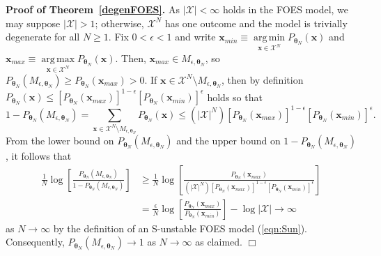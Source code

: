 \documentclass[12pt]{article}
\theoremstyle{definition}
\DeclareMathOperator*{\argmin}{arg\,min}
\DeclareMathOperator*{\argmax}{arg\,max}
\begin{document}
\noindent\textbf{Proof of Theorem~\ref{degenFOES}.} As
\(|\mathcal{X}|<\infty\) holds in the FOES model, we may suppose
\(|\mathcal{X}|>1\);
otherwise,   \(\mathcal{X}^N\) has  one outcome and the model is  trivially degenerate for all
\(N \geq 1\). Fix \(0 < \epsilon < 1\) and write
\(\boldsymbol x_{min} \equiv \argmin\limits_{\boldsymbol x \in \mathcal{X}^N}P_{\boldsymbol \theta_N}(\boldsymbol x)\)
and
\(\boldsymbol x_{max} \equiv \argmax\limits_{\boldsymbol x \in \mathcal{X}^N}P_{\boldsymbol \theta_N}(\boldsymbol x)\). Then,
\(\boldsymbol x_{max} \in M_{\epsilon, \boldsymbol \theta_N}\), so
\(P_{\boldsymbol \theta_N}(M_{\epsilon, \boldsymbol \theta_N}) \ge P_{\boldsymbol \theta_N}(\boldsymbol x_{max}) > 0\).
If
\(\boldsymbol x \in \mathcal{X}^N \setminus M_{\epsilon, \boldsymbol \theta_N}\),
then by definition
\(P_{\boldsymbol \theta_N}(\boldsymbol x) \le [P_{\boldsymbol \theta_N}(\boldsymbol x_{max})]^{1-\epsilon}[P_{\boldsymbol \theta_N}(\boldsymbol x_{min})]^{\epsilon}\)
holds so that
\[
1-P_{\boldsymbol \theta_N}(M_{\epsilon, \boldsymbol \theta_N})
 = \sum\limits_{\boldsymbol x \in \mathcal{X}^N \setminus M_{\epsilon, \boldsymbol \theta_N}}P_{\boldsymbol \theta_N}(\boldsymbol x)
  \le (|\mathcal{X}|^N)[P_{\boldsymbol \theta_N}(\boldsymbol x_{max})]^{1-\epsilon}[P_{\boldsymbol \theta_N}(\boldsymbol x_{min})]^{\epsilon}.
\]
From the lower bound on
\(P_{\boldsymbol \theta_N}(M_{\epsilon, \boldsymbol \theta_N})\) and the
upper bound on
\(1-P_{\boldsymbol \theta_N}(M_{\epsilon, \boldsymbol \theta_N})\), it
follows that
\begin{align*}
\frac{1}{N}\log\left[\frac{P_{\boldsymbol \theta_N}(M_{\epsilon, \boldsymbol \theta_N})}{1-P_{\boldsymbol \theta_N}(M_{\epsilon, \boldsymbol \theta_N})}\right] & \ge \frac{1}{N} \log\left[\frac{P_{\boldsymbol\theta_N}(\boldsymbol x_{max})}{(|\mathcal{X}|^N)[P_{\boldsymbol \theta_N}(\boldsymbol x_{max})]^{1-\epsilon}[P_{\boldsymbol \theta_N}(\boldsymbol x_{min})]^{\epsilon}}\right] \\
&= \frac{\epsilon}{N} \log\left[\frac{P_{\boldsymbol \theta_N}(\boldsymbol x_{max})}{P_{\boldsymbol \theta_N}(\boldsymbol x_{min})}\right] - \log |\mathcal{X}| \rightarrow \infty
\end{align*}
as \(N \rightarrow \infty\) by the definition of an S-unstable FOES
model (\ref{eqn:Sun}). Consequently,
\(P_{\boldsymbol \theta_N}(M_{\epsilon, \boldsymbol \theta_N}) \rightarrow 1\)
as \(N \rightarrow \infty\) as claimed. \hfill \(\Box\)\\
\end{document}
